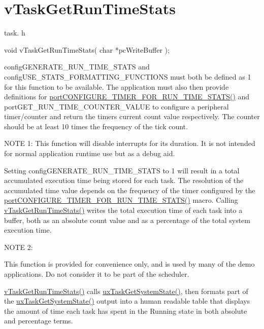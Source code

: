\hypertarget{group__vTaskGetRunTimeStats}{}\section{v\+Task\+Get\+Run\+Time\+Stats}
\label{group__vTaskGetRunTimeStats}
task. h 
\begin{DoxyPre}void vTaskGetRunTimeStats( char *pcWriteBuffer );\end{DoxyPre}


config\+G\+E\+N\+E\+R\+A\+T\+E\+\_\+\+R\+U\+N\+\_\+\+T\+I\+M\+E\+\_\+\+S\+T\+A\+TS and config\+U\+S\+E\+\_\+\+S\+T\+A\+T\+S\+\_\+\+F\+O\+R\+M\+A\+T\+T\+I\+N\+G\+\_\+\+F\+U\+N\+C\+T\+I\+O\+NS must both be defined as 1 for this function to be available. The application must also then provide definitions for \hyperlink{FreeRTOS_8h_a727939bcdb98501e0eba0ec8a1841e1b}{port\+C\+O\+N\+F\+I\+G\+U\+R\+E\+\_\+\+T\+I\+M\+E\+R\+\_\+\+F\+O\+R\+\_\+\+R\+U\+N\+\_\+\+T\+I\+M\+E\+\_\+\+S\+T\+A\+T\+S()} and port\+G\+E\+T\+\_\+\+R\+U\+N\+\_\+\+T\+I\+M\+E\+\_\+\+C\+O\+U\+N\+T\+E\+R\+\_\+\+V\+A\+L\+UE to configure a peripheral timer/counter and return the timers current count value respectively. The counter should be at least 10 times the frequency of the tick count.

N\+O\+TE 1\+: This function will disable interrupts for its duration. It is not intended for normal application runtime use but as a debug aid.

Setting config\+G\+E\+N\+E\+R\+A\+T\+E\+\_\+\+R\+U\+N\+\_\+\+T\+I\+M\+E\+\_\+\+S\+T\+A\+TS to 1 will result in a total accumulated execution time being stored for each task. The resolution of the accumulated time value depends on the frequency of the timer configured by the \hyperlink{FreeRTOS_8h_a727939bcdb98501e0eba0ec8a1841e1b}{port\+C\+O\+N\+F\+I\+G\+U\+R\+E\+\_\+\+T\+I\+M\+E\+R\+\_\+\+F\+O\+R\+\_\+\+R\+U\+N\+\_\+\+T\+I\+M\+E\+\_\+\+S\+T\+A\+T\+S()} macro. Calling \hyperlink{task_8h_ac34910d5eac69f0538ee218e527663a7}{v\+Task\+Get\+Run\+Time\+Stats()} writes the total execution time of each task into a buffer, both as an absolute count value and as a percentage of the total system execution time.

N\+O\+TE 2\+:

This function is provided for convenience only, and is used by many of the demo applications. Do not consider it to be part of the scheduler.

\hyperlink{task_8h_ac34910d5eac69f0538ee218e527663a7}{v\+Task\+Get\+Run\+Time\+Stats()} calls \hyperlink{task_8h_ade68760111c37287a3b82c41dff8ec7d}{ux\+Task\+Get\+System\+State()}, then formats part of the \hyperlink{task_8h_ade68760111c37287a3b82c41dff8ec7d}{ux\+Task\+Get\+System\+State()} output into a human readable table that displays the amount of time each task has spent in the Running state in both absolute and percentage terms.

